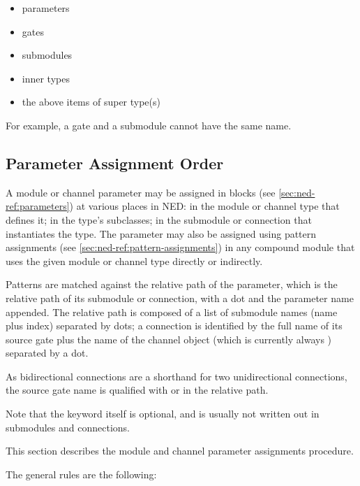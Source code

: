 \begin{itemize}
  \item parameters
  \item gates
  \item submodules
  \item inner types
  \item the above items of super type(s)
\end{itemize}

For example, a gate and a submodule cannot have the same name.


\subsection{Parameter Assignment Order}
\label{sec:ned-ref:param-assignment-order}

A module or channel parameter may be assigned in 
blocks (see \ref{sec:ned-ref:parameters}) at various places in NED: in
the module or channel type that defines it; in the type's subclasses; in
the submodule or connection that instantiates the type. The parameter may
also be assigned using pattern assignments (see
\ref{sec:ned-ref:pattern-assignments}) in any compound module that uses
the given module or channel type directly or indirectly.

Patterns are matched against the relative path of the parameter, which is
the relative path of its submodule or connection, with a dot and the
parameter name appended. The relative path is composed of a list of
submodule names (name plus index) separated by dots; a connection is
identified by the full name of its source gate plus the name of the channel
object (which is currently always ) separated by a dot.

\begin{note}
As bidirectional connections are a shorthand for two unidirectional
connections, the source gate name is qualified with  or
 in the relative path.
\end{note}

Note that the  keyword itself is optional,
and is usually not written out in submodules and connections.

This section describes the module and channel parameter assignments procedure.

The general rules are the following:

